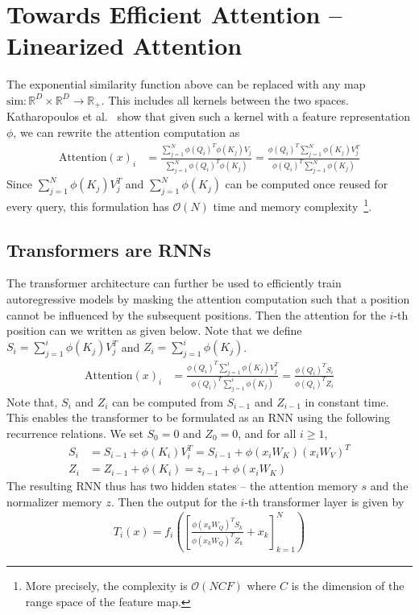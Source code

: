 \documentclass{article}
\newcommand{\R}{\mathbb{R}}
\begin{document}
    \section{Towards Efficient Attention -- Linearized Attention} \label{transformersRNNs}
    The exponential similarity function above can be replaced with any map $\text{sim}: \R^D \times \R^D \to \R_+$. This includes all kernels between the two spaces. Katharopoulos et al.~\cite{transformersRNN} show that given such a kernel with a feature representation $\phi$, we can rewrite the attention computation as
    \begin{align*}
        \text{Attention}(x)_i &= \frac{\sum_{j=1}^N \phi(Q_i)^T\phi(K_j)V_j}{\sum_{j=1}^N \phi(Q_i)^T\phi(K_j)} = \frac{\phi(Q_i)^T\sum_{j=1}^N \phi(K_j)V_j^T}{ \phi(Q_i)^T \sum_{j=1}^N \phi(K_j)}
    \end{align*}
    Since $\sum_{j=1}^N \phi(K_j)V_j^T$ and $\sum_{j=1}^N \phi(K_j)$ can be computed once reused for every query, this formulation has $\mathcal{O}(N)$ time and memory complexity~\footnote{More precisely, the complexity is $\mathcal{O}(NCF)$ where $C$ is the dimension of the range space of the feature map.}. 
\subsection{Transformers are RNNs}
The transformer architecture can further be used to efficiently train autoregressive models by masking the attention computation such that a position cannot be influenced by the subsequent positions. Then the attention for the $i$-th position can we written as given below. Note that we define $S_i = \sum_{j=1}^i \phi(K_j)V_j^T$ and $Z_i = \sum_{j=1}^i \phi(K_j)$. 
\begin{align*}
    \text{Attention}(x)_i &= \frac{\phi(Q_i)^T\sum_{j=1}^i \phi(K_j)V_j^T}{ \phi(Q_i)^T \sum_{j=1}^i \phi(K_j)} = \frac{\phi(Q_i)^TS_i}{\phi(Q_i)^TZ_i}
\end{align*}
Note that, $S_i$ and $Z_i$ can be computed from $S_{i-1}$ and $Z_{i-1}$ in constant time. This enables the transformer to be formulated as an RNN using the following recurrence relations. We set $S_0 = 0$ and $Z_0 = 0$, and for all $i \ge 1$,
\begin{align*}
    S_i &= S_{i-1} + \phi(K_i)V_i^T = S_{i-1} + \phi(x_iW_K)(x_iW_V)^T \\
    Z_i &= Z_{i-1} + \phi(K_i) = z_{i-1} + \phi(x_iW_K)
\end{align*}
The resulting RNN thus has two hidden states -- the attention memory $s$ and the normalizer memory $z$. Then the output for the $i$-th transformer layer is given by
\begin{align*}
    T_i(x)=f_i \left( \left[ \frac{\phi(x_kW_Q)^TS_k}{\phi(x_kW_Q)^TZ_k} + x_k \right]_{k=1}^N \right)
\end{align*}
\end{document}
